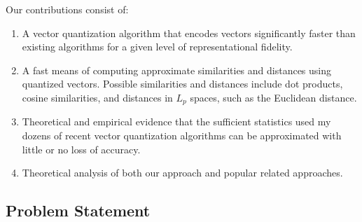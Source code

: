 Our contributions consist of:
\begin{enumerate}
\item A vector quantization algorithm that encodes vectors significantly faster than existing algorithms for a given level of representational fidelity.
\item A fast means of computing approximate similarities and distances using quantized vectors. Possible similarities and distances include dot products, cosine similarities, and distances in $L_p$ spaces, such as the Euclidean distance.
\item Theoretical and empirical evidence that the sufficient statistics used my dozens of recent vector quantization algorithms can be approximated with little or no loss of accuracy.
\item Theoretical analysis of both our approach and popular related approaches.
\end{enumerate}















\subsection{Problem Statement}

